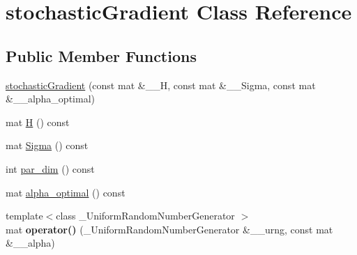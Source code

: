 \hypertarget{classstochasticGradient}{\section{stochastic\-Gradient Class Reference}
\label{classstochasticGradient}
}
\subsection*{Public Member Functions}
\begin{DoxyCompactItemize}
\item 
\hyperlink{classstochasticGradient_ad1946b90063b1f409b262d642bc0ae9c}{stochastic\-Gradient} (const mat \&\-\_\-\-\_\-\-H, const mat \&\-\_\-\-\_\-\-Sigma, const mat \&\-\_\-\-\_\-alpha\-\_\-optimal)
\item 
mat \hyperlink{classstochasticGradient_aa356b9fbec43aae939479da92de860b7}{H} () const 
\item 
mat \hyperlink{classstochasticGradient_a86b458a09098df76df558e09284505ed}{Sigma} () const 
\item 
int \hyperlink{classstochasticGradient_acde562a9a88098494468c2d30b0914e6}{par\-\_\-dim} () const 
\item 
mat \hyperlink{classstochasticGradient_a3bc27b596c185241a77bc4a4c36b4fe9}{alpha\-\_\-optimal} () const 
\item 
\hypertarget{classstochasticGradient_a523ea3de5a61632dfba24fbc03d35fba}{{\footnotesize template$<$class \-\_\-\-Uniform\-Random\-Number\-Generator $>$ }\\mat {\bfseries operator()} (\-\_\-\-Uniform\-Random\-Number\-Generator \&\-\_\-\-\_\-urng, const mat \&\-\_\-\-\_\-alpha)}\label{classstochasticGradient_a523ea3de5a61632dfba24fbc03d35fba}

\end{DoxyCompactItemize}


